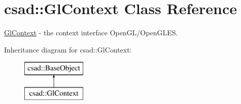 \hypertarget{classcsad_1_1_gl_context}{\section{csad\-:\-:Gl\-Context Class Reference}
\label{classcsad_1_1_gl_context}
}


\hyperlink{classcsad_1_1_gl_context}{Gl\-Context} -\/ the context interface Open\-G\-L/\-Open\-G\-L\-E\-S.  


Inheritance diagram for csad\-:\-:Gl\-Context\-:\begin{figure}[H]
\begin{center}
\leavevmode
\includegraphics[height=2.000000cm]{classcsad_1_1_gl_context}
\end{center}
\end{figure}
